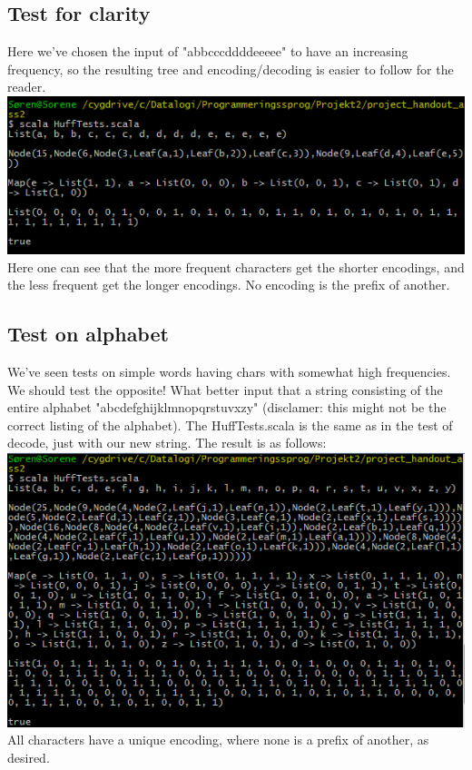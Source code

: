 \documentclass{article}
\begin{document}
\subsection{Test for clarity}
Here we've chosen the input of "abbcccddddeeeee" to have an increasing frequency, so the resulting tree and encoding/decoding is easier to follow for the reader. 
\newline
\includegraphics{test13.png}
Here one can see that the more frequent characters get the shorter encodings, and the less frequent get the longer encodings. No encoding is the prefix of another.
\subsection{Test on alphabet}
We've seen tests on simple words having chars with somewhat high frequencies. We should test the opposite! What better input that a string consisting of the entire alphabet "abcdefghijklmnopqrstuvxzy" (disclamer: this might not be the correct listing of the alphabet). The HuffTests.scala is the same as in the test of decode, just with our new string. The result is as follows:
\includegraphics{test12.png}
All characters have a unique encoding, where none is a prefix of another, as desired.
\end{document}
